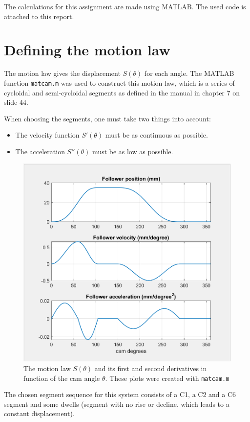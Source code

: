 \documentclass[a4paper]{article}
\begin{document}
The calculations for this assignment are made using MATLAB. The used code is attached to this report.

\clearpage
\tableofcontents

\section{Defining the motion law}

The motion law gives the displacement \(S(\theta)\) for each angle. The MATLAB function \texttt{matcam.m} was used to construct this motion law, which is a series of cycloidal and semi-cycloidal segments as defined in the manual \cite{cursus} in chapter 7 on slide 44.

When choosing the segments, one must take two things into account:
\begin{itemize}
	\item The velocity function \(S'(\theta)\) must be as continuous as possible.
	\item The acceleration \(S''(\theta)\) must be as low as possible.
\end{itemize}


\begin{figure}
	\centering
	\includegraphics[width=.7\textwidth]{hefwet.png}
	\caption{The motion law \(S(\theta)\) and its first and second derivatives in function of the cam angle \(\theta\). These plots were created with \texttt{matcam.m}}
	\label{fig:hefwet}
	
\end{figure}

The chosen segment sequence for this system consists of a C1, a C2 and a C6 segment and some dwells (segment with no rise or decline, which leads to a constant displacement).
\end{document}
